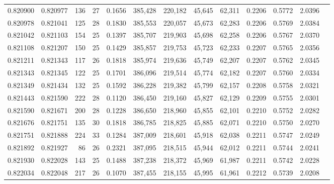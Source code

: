 \begin{tabular}{rrrrrrrrrrrrr}
0.820900 & 0.820977 &   136 &  27 &                                     0.1656 & 385,428 & 220,182 &  45,645 &  62,311 & 0.2206 & 0.5772 & 2.0396 \\
0.820978 & 0.821041 &   125 &  28 &                                     0.1830 & 385,553 & 220,057 &  45,673 &  62,283 & 0.2206 & 0.5769 & 2.0384 \\
0.821042 & 0.821103 &   154 &  25 &                                     0.1397 & 385,707 & 219,903 &  45,698 &  62,258 & 0.2206 & 0.5767 & 2.0370 \\
0.821108 & 0.821207 &   150 &  25 &                                     0.1429 & 385,857 & 219,753 &  45,723 &  62,233 & 0.2207 & 0.5765 & 2.0356 \\
0.821211 & 0.821343 &   117 &  26 &                                     0.1818 & 385,974 & 219,636 &  45,749 &  62,207 & 0.2207 & 0.5762 & 2.0345 \\
0.821343 & 0.821345 &   122 &  25 &                                     0.1701 & 386,096 & 219,514 &  45,774 &  62,182 & 0.2207 & 0.5760 & 2.0334 \\
0.821349 & 0.821434 &   132 &  25 &                                     0.1592 & 386,228 & 219,382 &  45,799 &  62,157 & 0.2208 & 0.5758 & 2.0321 \\
0.821443 & 0.821590 &   222 &  28 &                                     0.1120 & 386,450 & 219,160 &  45,827 &  62,129 & 0.2209 & 0.5755 & 2.0301 \\
0.821590 & 0.821671 &   200 &  28 &                                     0.1228 & 386,650 & 218,960 &  45,855 &  62,101 & 0.2210 & 0.5752 & 2.0282 \\
0.821676 & 0.821751 &   135 &  30 &                                     0.1818 & 386,785 & 218,825 &  45,885 &  62,071 & 0.2210 & 0.5750 & 2.0270 \\
0.821751 & 0.821888 &   224 &  33 &                                     0.1284 & 387,009 & 218,601 &  45,918 &  62,038 & 0.2211 & 0.5747 & 2.0249 \\
0.821892 & 0.821927 &    86 &  26 &                                     0.2321 & 387,095 & 218,515 &  45,944 &  62,012 & 0.2211 & 0.5744 & 2.0241 \\
0.821930 & 0.822028 &   143 &  25 &                                     0.1488 & 387,238 & 218,372 &  45,969 &  61,987 & 0.2211 & 0.5742 & 2.0228 \\
0.822034 & 0.822048 &   217 &  26 &                                     0.1070 & 387,455 & 218,155 &  45,995 &  61,961 & 0.2212 & 0.5739 & 2.0208 \\

\end{tabular}
